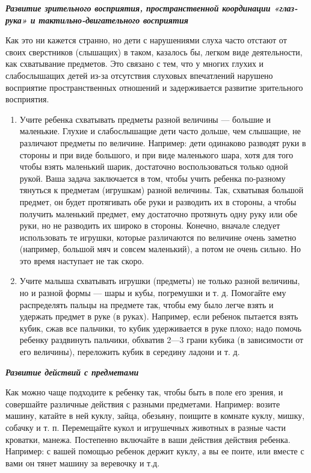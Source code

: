 \documentclass{book}
\renewcommand{\emph}[1]{\textit{#1}}
\begin{document}
\emph{\textbf{Развитие зрительного восприятия, пространственной
координации «глаз-рука» и тактильно-двигательного восприятия}}

Как это ни кажется странно, но дети с нарушениями слуха часто отстают от
своих сверстников (слышащих) в таком, казалось бы, легком виде
деятельности, как схватывание предметов. Это связано с тем, что у многих
глухих и слабослышащих детей из-за отсутствия слуховых впечатлений
нарушено восприятие пространственных отношений и задерживается развитие
зрительного восприятия.


\begin{enumerate}
\def\labelenumi{\arabic{enumi}.}
\item
  
  Учите ребенка схватывать предметы разной величины --- большие и
  маленькие. Глухие и слабослышащие дети часто дольше, чем слышащие, не
  различают предметы по величине. Например: дети одинаково разводят руки
  в стороны и при виде большого, и при виде маленького шара, хотя для
  того чтобы взять маленький шарик, достаточно воспользоваться только
  одной рукой. Ваша задача заключается в том, чтобы учить ребенка
  по-разному тянуться к предметам (игрушкам) разной величины. Так,
  схватывая большой предмет, он будет протягивать обе руки и разводить
  их в стороны, а чтобы получить маленький предмет, ему достаточно
  протянуть одну руку или обе руки, но не разводить их широко в стороны.
  Конечно, вначале следует использовать те игрушки, которые различаются
  по величине очень заметно (например, большой мяч и совсем маленький),
  а потом не очень сильно. Но это время наступает не так скоро.
  
\item
  
  Учите малыша схватывать игрушки (предметы) не только разной величины,
  но и разной формы --- шары и кубы, погремушки и т. д. Помогайте ему
  распределять пальцы на предмете так, чтобы ему было легче взять и
  удержать предмет в руке (в руках). Например, если ребенок пытается
  взять кубик, сжав все пальчики, то кубик удерживается в руке плохо;
  надо помочь ребенку раздвинуть пальчики, обхватив 2---3 грани кубика
  (в зависимости от его величины), переложить кубик в середину ладони и
  т. д.
  
\end{enumerate}


\emph{\textbf{Развитие действий с предметами}}

Как можно чаще подходите к ребенку так, чтобы быть в поле его зрения, и
совершайте различные действия с разными предметами. Например: возите
машину, катайте в ней куклу, зайца, обезьяну, поищите в комнате куклу,
мишку, собачку и т. п. Перемещайте кукол и игрушечных животных в разные
части кроватки, манежа. Постепенно включайте в ваши действия действия
ребенка. Например: с вашей помощью ребенок держит куклу, а вы ее поите,
или вместе с вами он тянет машину за веревочку и т.д.
\end{document}
